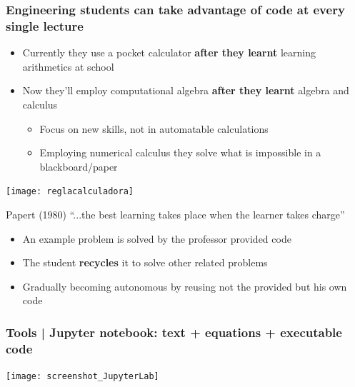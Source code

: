\documentclass[aspectratio=169]{beamer}
\begin{document}
\begin{frame}
	\frametitle{Engineering students can take advantage of code at every single lecture}
	\pause
	\begin{block}{}
		\begin{itemize}[<+->]
			\item Currently they use a pocket calculator \textbf{after they learnt} learning arithmetics at school
			\item Now they'll employ computational algebra \textbf{after they learnt} algebra and calculus
			\begin{itemize}[<+->]
				\item Focus on new skills, not in automatable calculations
				\item Employing numerical calculus they solve what is impossible in a blackboard/paper
			\end{itemize}
			\end{itemize}
	\texttt{[image: reglacalculadora]}
	\uncover<3->{\texttt{[image: hard]}}
	\end{block}
	\pause
	\begin{block}{}
		Papert (1980) ``...the best learning takes place when the learner takes charge''
		\begin{itemize}[<+->]
			\item An example problem is solved by the professor provided code
			\item The student \textbf{recycles} it to solve other related problems
			\item Gradually becoming autonomous by reusing not the provided but his own code
		\end{itemize}
	\end{block}
\end{frame}


\begin{frame}
	\frametitle{Tools | Jupyter notebook: text + equations + executable code}
	\begin{block}{}
		\texttt{[image: screenshot\_JupyterLab]}
	\end{block}
\end{frame}
\end{document}
